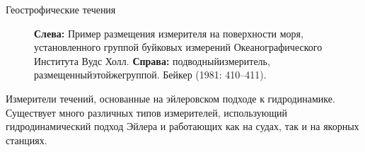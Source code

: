 \begin{chapter}{Геострофические течения}
\begin{figure}[b!]
\caption{\textbf{Слева:} Пример размещения измерителя на поверхности
моря, установленного группой буйковых измерений Океанографического
Института Вудс Холл. \textbf{Справа:} подводныйизмеритель,
размещенныйэтойжегруппой. Бейкер (1981: 410--411).}
\label{fig:moorings}
\end{figure}
%

\begin{section}{Измерители течений, основанные на эйлеровском подходе 
к гидродинамике.}
Существует много различных типов измерителей, использующий
гидродинамический подход Эйлера и работающих как на судах, так и на
якорных станциях.
%


\end{section}
\end{chapter}
